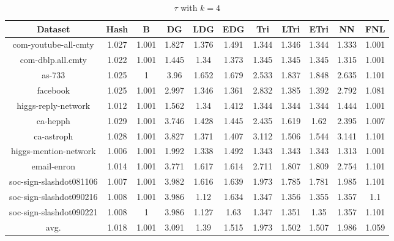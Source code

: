 \documentclass{sig-alternate-2013}
\begin{document}
\begin{table}[!hpp]
\centering
\caption{$\tau$ with $k=4$}
\begin{tabular}{ccccccccccc}
\hline
Dataset                 &Hash       &B          &DG         &LDG        &EDG        &Tri        &LTri       &ETri      &NN         &FNL\\
\hline
com-youtube-all-cmty    &1.027&1.001&1.827&1.376&1.491&1.344&1.346&1.344&1.333&1.001\\
com-dblp.all.cmty       &1.022&1.001&1.445&1.34&1.373&1.345&1.345&1.345&1.315&1.001\\
as-733                  &1.025&1&3.96&1.652&1.679&2.533&1.837&1.848&2.635&1.101\\
facebook                &1.025&1.001&2.997&1.346&1.361&2.832&1.385&1.392&2.792&1.081\\
higgs-reply-network     &1.012&1.001&1.562&1.34&1.412&1.344&1.344&1.344&1.444&1.001\\
ca-hepph                &1.029&1.001&3.746&1.428&1.445&2.435&1.619&1.62&2.395&1.007\\
ca-astroph              &1.028&1.001&3.827&1.371&1.407&3.112&1.506&1.544&3.141&1.101\\
higgs-mention-network   &1.006&1.001&1.992&1.338&1.492&1.343&1.343&1.343&1.313&1.001\\
email-enron             &1.014&1.001&3.771&1.617&1.614&2.711&1.807&1.809&2.754&1.101\\
soc-sign-slashdot081106 &1.007&1.001&3.982&1.616&1.639&1.973&1.785&1.781&1.985&1.101\\
soc-sign-slashdot090216 &1.008&1.001&3.986&1.12&1.634&1.347&1.356&1.355&1.357&1.1\\
soc-sign-slashdot090221 &1.008&1&3.986&1.127&1.63&1.347&1.351&1.35&1.357&1.101\\
\hline
avg.                    &1.018&1.001&3.091&1.39&1.515&1.973&1.502&1.507&1.986&1.059\\
\hline
\end{tabular}
\end{table}
\end{document}
